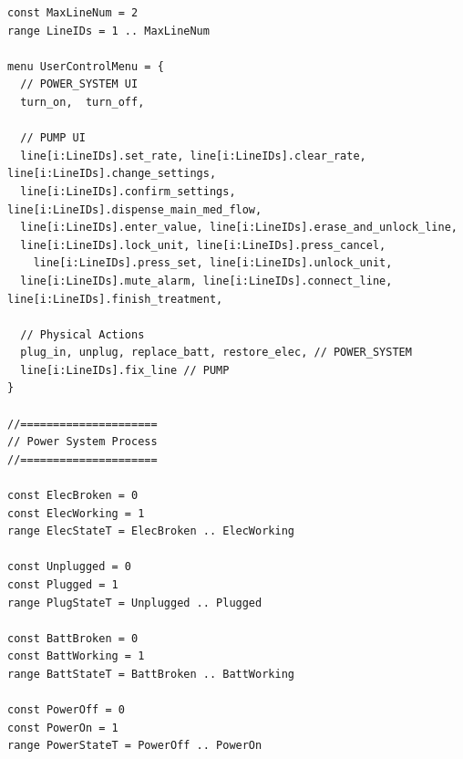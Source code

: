 \documentclass[titlepage]{article}
\begin{document}
\begin{verbatim}
const MaxLineNum = 2
range LineIDs = 1 .. MaxLineNum

menu UserControlMenu = {
  // POWER_SYSTEM UI
  turn_on,  turn_off,
  
  // PUMP UI
  line[i:LineIDs].set_rate, line[i:LineIDs].clear_rate, line[i:LineIDs].change_settings,
  line[i:LineIDs].confirm_settings, line[i:LineIDs].dispense_main_med_flow,
  line[i:LineIDs].enter_value, line[i:LineIDs].erase_and_unlock_line,
  line[i:LineIDs].lock_unit, line[i:LineIDs].press_cancel, 
    line[i:LineIDs].press_set, line[i:LineIDs].unlock_unit,
  line[i:LineIDs].mute_alarm, line[i:LineIDs].connect_line, line[i:LineIDs].finish_treatment,

  // Physical Actions
  plug_in, unplug, replace_batt, restore_elec, // POWER_SYSTEM
  line[i:LineIDs].fix_line // PUMP
}

//=====================
// Power System Process 
//=====================

const ElecBroken = 0
const ElecWorking = 1
range ElecStateT = ElecBroken .. ElecWorking

const Unplugged = 0
const Plugged = 1
range PlugStateT = Unplugged .. Plugged

const BattBroken = 0
const BattWorking = 1
range BattStateT = BattBroken .. BattWorking

const PowerOff = 0
const PowerOn = 1
range PowerStateT = PowerOff .. PowerOn


\end{verbatim}
\end{document}

